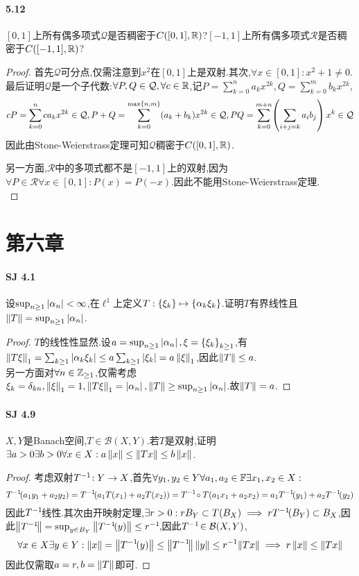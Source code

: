 \documentclass[UTF8]{article}
\begin{document}
\paragraph*{5.12}$[0,1]$上所有偶多项式$\mathcal{Q}$是否稠密于$C([0,1],\mathbb{R})$?$[-1,1]$上所有偶多项式$\mathcal{R}$是否稠密于$C([-1,1],\mathbb{R})$?
\begin{proof}
    首先$\mathcal{Q}$可分点,仅需注意到$x^2$在$[0,1]$上是双射.其次,$\forall x\in [0,1]:x^2+1\neq 0$.\\
    最后证明$\mathcal{Q}$是一个子代数:$\forall P,Q\in \mathcal{Q},\forall c\in \mathbb{R}$,记$P=\sum_{k= 0}^na_kx^{2k},Q=\sum_{k= 0}^mb_kx^{2k}$,
    $$cP=\sum_{k= 0}^nca_kx^{2k}\in\mathcal{Q},P+Q=\sum_{k= 0}^{\max\left\{n,m\right\}}(a_k+b_k)x^{2k}\in\mathcal{Q}, PQ=\sum_{k= 0}^{m+n}\!\left(\sum_{i+j=k}a_ib_j\right)x^{k}\in\mathcal{Q}$$
    因此由Stone-Weierstrass定理可知$\mathcal{Q}$稠密于$C([0,1],\mathbb{R})$.

    另一方面,$\mathcal{R}$中的多项式都不是$[-1,1]$上的双射,因为$\forall P\in \mathcal{R}\forall x\in [0,1]:P(x)=P(-x)$.因此不能用Stone-Weierstrass定理.\\

\end{proof}

\newpage
\section{第六章}
\paragraph*{SJ 4.1}设$\sup_{n\geq 1}\left|\alpha_n\right|<\infty$,在$\ell^1$上定义$T:\left\{\xi_k\right\}\mapsto \left\{\alpha_k\xi_k\right\}$.证明$T$有界线性且$\left\|T\right\|=\sup_{n\geq 1}\left|\alpha_n\right|$.
\begin{proof}
    $T$的线性性显然.设$a=\sup_{n\geq 1}\left|\alpha_n\right|,\xi=\left\{\xi_k\right\}_{k\geq 1}$,有$\left\|T\xi\right\|_1=\sum_{k\geq 1}\left|\alpha_k\xi_k\right|\leq a\sum_{k\geq 1}\left|\xi_k\right|=a\left\|\xi\right\|_1$,因此$\left\|T\right\|\leq a$.\\
    另一方面对$\forall n\in \mathbb{Z}_{\geq 1}$,仅需考虑$\xi_k=\delta_{kn},\left\|\xi\right\|_1=1,\left\|T\xi\right\|_1=\left|\alpha_n\right|,\left\|T\right\|\geq\sup_{n\geq 1}\left|\alpha_n\right|$.故$\left\|T\right\|=a$.
\end{proof}

\paragraph*{SJ 4.9}$X,Y$是Banach空间,$T\in \mathcal{B}(X,Y)$.若$T$是双射,证明$\exists a>0\exists b>0\forall x\in X:a\left\|x\right\|\leq \left\|Tx\right\|\leq b\left\|x\right\|$.
\begin{proof}
    考虑双射$T^{-1}\!:Y\to X$,首先$\forall y_1,y_2\in Y\forall a_1,a_2\in \mathbb{F}\exists x_1,x_2\in X:$$$T^{-1}\!(a_1y_1+a_2y_2)=T^{-1}\!(a_1T(x_1)+a_2T(x_2))=T^{-1}\!\circ T(a_1x_1+a_2x_2)=a_1T^{-1}\!(y_1)+a_2T^{-1}\!(y_2)$$
    因此$T^{-1}\!$线性.其次由开映射定理,$\exists r>0:rB_Y\subset T(B_X)\implies rT^{-1}\!(B_Y)\subset B_X$,因此$\left\|T^{-1}\!\right\|=\sup_{y\in B_Y}\left\|T^{-1}\!(y)\right\|\leq r^{-1}\!$,因此$T^{-1}\!\in \mathcal{B}(X,Y)$,
    $$\forall x\in X\exists y\in Y:\left\|x\right\|=\left\|T^{-1}\!(y)\right\|\leq \left\|T^{-1}\!\right\|\left\|y\right\|\leq r^{-1}\!\left\|Tx\right\|\implies r\left\|x\right\|\leq \left\|Tx\right\|$$
    因此仅需取$a=r,b=\left\|T\right\|$即可.
\end{proof}
\end{document}
